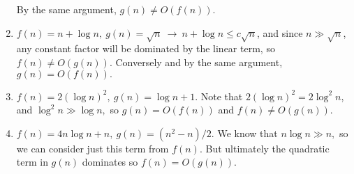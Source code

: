 \documentclass{report}
\begin{document}
\begin{enumerate}[label=(\alph*)]
		By the same argument, $g(n) \ne O(f(n)).$

	\item $f(n) = n + \log n,\ g(n) = \sqrt{n}\ \rightarrow\ n + \log n \le c\sqrt{n}$, and since $n \gg \sqrt{n}$, any constant factor will be dominated by the linear term, so $f(n) \ne O(g(n)).$ Conversely and by the same argument, $g(n) = O(f(n)).$

	\item $f(n) = 2\left(\log n\right)^2,\ g(n) = \log n + 1.$ Note that $2\left(\log n\right)^2 = 2\log^2 n$, and $\log^2 n \gg \log n,$ so $g(n) = O(f(n))$ and $f(n) \ne O(g(n)).$

	\item $f(n) = 4n\log n + n,\ g(n) = \left(n^2 - n\right)/2.$ We know that $n\log n \gg n,$ so we can consider just this term from $f(n).$ But ultimately the quadratic term in $g(n)$ dominates so $f(n) = O(g(n)).$
\end{enumerate}
\end{document}
